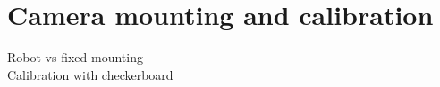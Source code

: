 \section{Camera mounting and calibration}
\label{sec:rc_camera}
Robot vs fixed mounting\\
Calibration with checkerboard\\